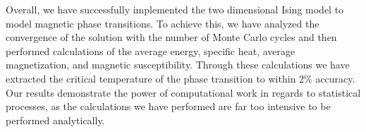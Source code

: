 \documentclass[prc,amsmath,twocolumn,superscriptaddress]{revtex4}
\begin{document}

Overall, we have successfully implemented the two dimensional Ising model to model magnetic phase transitions. To achieve this, we have analyzed the convergence of the solution with the number of Monte Carlo cycles and then performed calculations of the average energy, specific heat, average magnetization, and magnetic susceptibility. Through these calculations we have extracted the critical temperature of the phase transition to within 2\% accuracy. Our results demonstrate the power of computational work in regards to statistical processes, as the calculations we have performed are far too intensive to be performed analytically.





\end{document}
